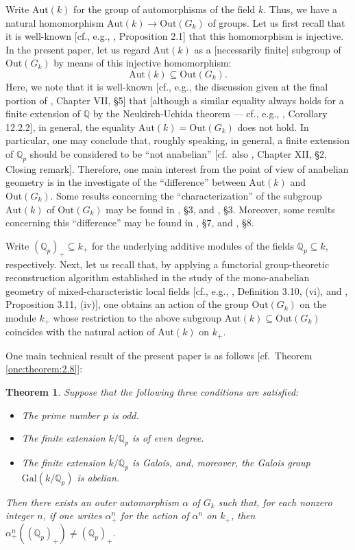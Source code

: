 \documentclass[12pt,showkeys]{amsart}
\theoremstyle{theorem}
\newtheorem{introtheorem}{Theorem}
\theoremstyle{definition}
\begin{document}
Write $\mathrm{Aut}(k)$ for the group of automorphisms of 
the field $k$.  Thus, we have a natural homomorphism 
$\mathrm{Aut}(k) \to \mathrm{Out}(G_k)$ of groups.  Let us 
first recall that it is well-known [cf., e.g., \cite{Hoshi1}, 
Proposition 2.1] that this homomorphism is injective.  In 
the present paper, let us regard $\mathrm{Aut}(k)$ as a 
[necessarily finite] subgroup of $\mathrm{Out}(G_k)$ by 
means of this injective homomorphism:  
\[
\mathrm{Aut}(k) \subseteq \mathrm{Out}(G_k).  
\]
Here, we note that it is well-known [cf., e.g., the 
discussion given at the final portion of \cite{NSW}, 
Chapter VII, \S 5] that [although a similar equality always holds for a finite extension 
of $\mathbb{Q}$ by the Neukirch-Uchida theorem --- cf., e.g., 
\cite{NSW}, Corollary 12.2.2], in general, the equality 
$\mathrm{Aut}(k) = \mathrm{Out}(G_k)$ does not hold.  
In particular, one may conclude that, roughly speaking, 
in general, a finite extension of $\mathbb{Q}_p$ 
should be considered to be ``not anabelian'' [cf.\ also \cite{NSW}, Chapter XII, \S 2, Closing remark]. Therefore, one main interest from the point of view of anabelian 
geometry is in the investigate of the ``difference'' between 
$\mathrm{Aut}(k)$ and $\mathrm{Out}(G_k)$.  
Some results concerning the ``characterization'' of the subgroup 
$\mathrm{Aut}(k)$ of $\mathrm{Out}(G_k)$ may be found in 
\cite{Mzk}, \S 3, and \cite{Hoshi-b}, 
\S 3.  Moreover, some results concerning this  ``difference'' may be found in \cite{Hoshi2}, \S 7, and 
\cite{Hoshi2}, \S 8.    


Write $(\mathbb{Q}_p)_+ \subseteq k_+$ for the underlying 
additive modules of the fields $\mathbb{Q}_p \subseteq k$, 
respectively.  Next, let us recall that, by applying a 
functorial group-theoretic reconstruction algorithm 
established in the study of the mono-anabelian geometry of mixed-characteristic local fields [cf., 
e.g., \cite{Hoshi1}, Definition 3.10, (vi), and \cite{Hoshi1}, 
Proposition 3.11, (iv)], one obtains an action of the group 
$\mathrm{Out}(G_k)$ on the module $k_+$ whose restriction 
to the above subgroup $\mathrm{Aut}(k) \subseteq 
\mathrm{Out}(G_k)$ coincides with the natural action of 
$\mathrm{Aut}(k)$ on $k_+$.  


One main technical result of the present paper is as 
follows [cf.\ Theorem \ref{one:theorem:2.8}]:

\begin{introtheorem}
\label{AAAAAAA}
Suppose that the following three conditions are 
satisfied:  
\begin{itemize}
\item[$(1)$]
The prime number $p$ is odd.  
\item[$(2)$]
The finite extension $k / \mathbb{Q}_p$ is 
of even degree.  
\item[$(3)$]
The finite extension $k / \mathbb{Q}_p$ is Galois, 
and, moreover, the Galois group 
$\mathrm{Gal}(k / \mathbb{Q}_p)$ is abelian.  
\end{itemize}
Then there exists an outer automorphism $\alpha$ of $G_k$ 
such that, for each nonzero integer $n$, if one writes 
$\alpha_+^n$ for the action of $\alpha^n$ on $k_+$, then 
$\alpha^n_+((\mathbb{Q}_p)_+) \neq (\mathbb{Q}_p)_+$.  
\end{introtheorem}
\end{document}
